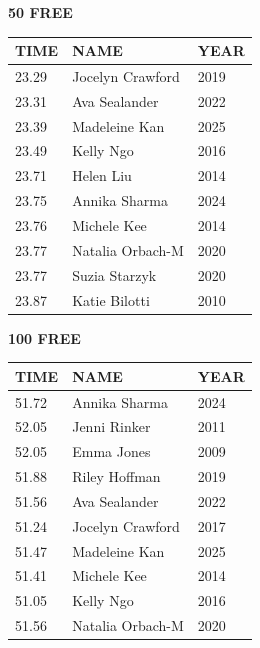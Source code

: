 \begin{table}[H]
\centering
\begin{minipage}[t]{0.48\textwidth}
\centering
\textbf{50 FREE}\\[0.1cm]
\begin{tabular}{@{}p{1.8cm}p{2.8cm}p{1.2cm}@{}}
\hline
    \textbf{TIME} & \textbf{NAME} & \textbf{YEAR} \\
\hline
    23.29 & Jocelyn Crawford & 2019 \\
    23.31 & Ava Sealander & 2022 \\
    23.39 & Madeleine Kan & 2025 \\
    23.49 & Kelly Ngo & 2016 \\
    23.71 & Helen Liu & 2014 \\
    23.75 & Annika Sharma & 2024 \\
    23.76 & Michele Kee & 2014 \\
    23.77 & Natalia Orbach-M & 2020 \\
    23.77 & Suzia Starzyk & 2020 \\
    23.87 & Katie Bilotti & 2010 \\
\hline
\end{tabular}
\end{minipage}\hfill
\begin{minipage}[t]{0.48\textwidth}
\centering
\textbf{100 FREE}\\[0.1cm]
\begin{tabular}{@{}p{1.8cm}p{2.8cm}p{1.2cm}@{}}
\hline
    \textbf{TIME} & \textbf{NAME} & \textbf{YEAR} \\
\hline
    51.72 & Annika Sharma & 2024 \\
    52.05 & Jenni Rinker & 2011 \\
    52.05 & Emma Jones & 2009 \\
    51.88 & Riley Hoffman & 2019 \\
    51.56 & Ava Sealander & 2022 \\
    51.24 & Jocelyn Crawford & 2017 \\
    51.47 & Madeleine Kan & 2025 \\
    51.41 & Michele Kee & 2014 \\
    51.05 & Kelly Ngo & 2016 \\
    51.56 & Natalia Orbach-M & 2020 \\
\hline
\end{tabular}
\end{minipage}
\end{table}

